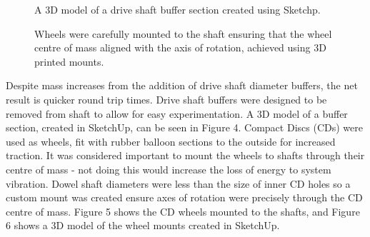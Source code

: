 \documentclass[a4paper]{article}
\begin{document}
\begin{figure}[h]
	\centering
	\begin{minipage}[t]{0.45\textwidth}
		\centering
		\caption{A 3D model of a drive shaft buffer section created using Sketchp.}
	\end{minipage}
	\hspace{1cm}
	\begin{minipage}[t]{0.45\textwidth}
		\centering
		\caption{Wheels were carefully mounted to the shaft ensuring that the wheel centre of mass aligned with the axis of rotation, achieved using 3D printed mounts.}
	\end{minipage}
\end{figure}

Despite mass increases from the addition of drive shaft diameter buffers, the net result is quicker round trip times. Drive shaft buffers were designed to be removed from shaft to allow for easy experimentation. A 3D model of a buffer section, created in SketchUp, can be seen in Figure 4. Compact Discs (CDs) were used as wheels, fit with rubber balloon sections to the outside for increased traction. It was considered important to mount the wheels to shafts through their centre of mass - not doing this would increase the loss of energy to system vibration. Dowel shaft diameters were less than the size of inner CD holes so a custom mount was created ensure axes of rotation were precisely through the CD centre of mass. Figure 5 shows the CD wheels mounted to the shafts, and Figure 6 shows a 3D model of the wheel mounts created in SketchUp.\\
\end{document}
